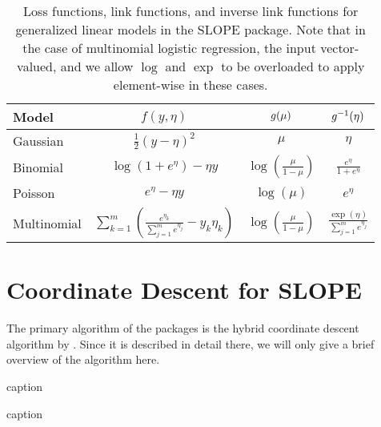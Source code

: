 \documentclass[article]{jss}
\begin{document}
\begin{table}[htpb]
  \centering
  \caption{Loss functions, link functions, and inverse link functions for
    generalized linear models in the SLOPE package. Note that in the case of
    multinomial logistic regression, the input vector-valued, and we allow
    \(\log\) and \(\exp\) to be overloaded to apply element-wise in these cases.
  }
  \label{tab:glm}
  \begin{tabular}{lccc}
    \toprule
    Model       & \(f(y, \eta)\)                                                                          & \(g(\mu)\)                            & \(g^{-1}(\eta)\)                               \\
    \midrule
    Gaussian    & \(\frac{1}{2}(y - \eta)^2\)                                                             & \(\mu\)                                   & \(\eta\)                                       \\
    \addlinespace
    Binomial    & \(\log(1 + e^\eta) - \eta y\)                                                           & \(\log \left(\frac{\mu}{1 - \mu}\right)\) & \(\frac{e^\eta}{1 + e^\eta}\)                  \\
    \addlinespace
    Poisson     & \(e^\eta - \eta y\)                                                                     & \(\log(\mu)\)                             & \(e^\eta\)                                     \\
    \addlinespace
    Multinomial & \(\sum_{k=1}^m\left( \frac{e^{\eta_k}}{\sum_{j=1}^m e^{\eta_j}} - y_k \eta_k  \right)\) & \(\log\left(\frac{\mu}{1 - \mu}\right) \) & \(\frac{\exp(\eta)}{\sum_{j=1}^m e^{\eta_j}}\) \\
    \bottomrule
  \end{tabular}
\end{table}

\section{Coordinate Descent for SLOPE}

The primary algorithm of the  packages is the hybrid
coordinate descent algorithm by \citet{larsson2023}. Since it is described in
detail there, we will only give a brief overview of the algorithm here.

\begin{algorithm}
  \caption{caption}
  \label{alg:label}

  \caption{caption}
\end{algorithm}
\end{document}
